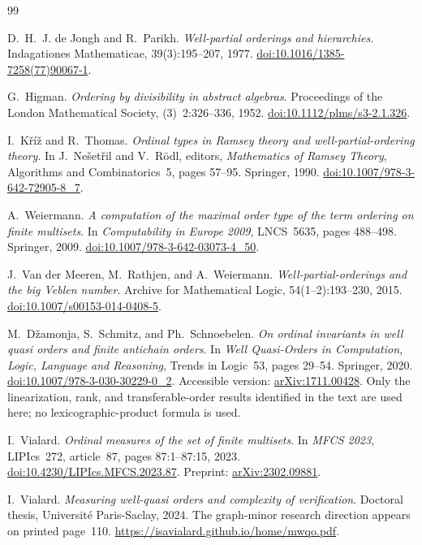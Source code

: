 \documentclass[11pt,letterpaper]{article}
\theoremstyle{plain}
\theoremstyle{definition}
\theoremstyle{remark}
\begin{document}
{}
\begin{thebibliography}{99}

D.~H.~J. de Jongh and R.~Parikh.
\emph{Well-partial orderings and hierarchies}.
Indagationes Mathematicae, 39(3):195--207, 1977.
\href{https://doi.org/10.1016/1385-7258(77)90067-1}{doi:10.1016/1385-7258(77)90067-1}.

G.~Higman.
\emph{Ordering by divisibility in abstract algebras}.
Proceedings of the London Mathematical Society, (3)~2:326--336, 1952.
\href{https://doi.org/10.1112/plms/s3-2.1.326}{doi:10.1112/plms/s3-2.1.326}.

I.~K\v r\'i\v z and R.~Thomas.
\emph{Ordinal types in Ramsey theory and well-partial-ordering theory}.
In J.~Ne\v set\v ril and V.~R\"odl, editors,
\emph{Mathematics of Ramsey Theory}, Algorithms and Combinatorics~5,
pages 57--95. Springer, 1990.
\href{https://doi.org/10.1007/978-3-642-72905-8_7}{doi:10.1007/978-3-642-72905-8\_7}.

A.~Weiermann.
\emph{A computation of the maximal order type of the term ordering on
finite multisets}.
In \emph{Computability in Europe 2009}, LNCS~5635, pages 488--498.
Springer, 2009.
\href{https://doi.org/10.1007/978-3-642-03073-4_50}{doi:10.1007/978-3-642-03073-4\_50}.

J.~Van der Meeren, M.~Rathjen, and A.~Weiermann.
\emph{Well-partial-orderings and the big Veblen number}.
Archive for Mathematical Logic, 54(1--2):193--230, 2015.
\href{https://doi.org/10.1007/s00153-014-0408-5}{doi:10.1007/s00153-014-0408-5}.

M.~D\v zamonja, S.~Schmitz, and Ph.~Schnoebelen.
\emph{On ordinal invariants in well quasi orders and finite antichain orders}.
In \emph{Well Quasi-Orders in Computation, Logic, Language and Reasoning},
Trends in Logic~53, pages 29--54. Springer, 2020.
\href{https://doi.org/10.1007/978-3-030-30229-0_2}{doi:10.1007/978-3-030-30229-0\_2}.
Accessible version: \href{https://arxiv.org/abs/1711.00428}{arXiv:1711.00428}.
Only the linearization, rank, and transferable-order results identified
in the text are used here; no lexicographic-product formula is used.

I.~Vialard.
\emph{Ordinal measures of the set of finite multisets}.
In \emph{MFCS 2023}, LIPIcs~272, article~87, pages 87:1--87:15, 2023.
\href{https://doi.org/10.4230/LIPIcs.MFCS.2023.87}{doi:10.4230/LIPIcs.MFCS.2023.87}.
Preprint: \href{https://arxiv.org/abs/2302.09881}{arXiv:2302.09881}.

I.~Vialard.
\emph{Measuring well-quasi orders and complexity of verification}.
Doctoral thesis, Universit\'e Paris-Saclay, 2024.
The graph-minor research direction appears on printed page~110.
\url{https://isavialard.github.io/home/mwqo.pdf}.

\end{thebibliography}
\end{document}
